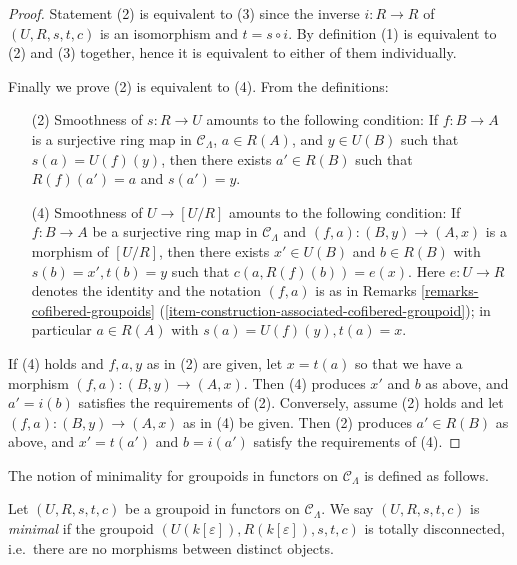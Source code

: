 \begin{proof}
Statement (2) is equivalent to (3) since the inverse $i: R \rightarrow R$ of 
$(U, R, s,t,c)$ is an isomorphism and $t = s \circ i$. By definition (1) is 
equivalent to (2) and (3) together, hence it is equivalent to either of them 
individually. 

\medskip \noindent
Finally we prove (2) is equivalent to (4). From the definitions:
\begin{enumerate}
\item[(2)] Smoothness of $s: R \rightarrow U$ amounts to the following 
condition: If $f: B \rightarrow A$ is a surjective ring map in $\mathcal 
C_{\Lambda}$, $a \in R(A)$, and $y \in U(B)$ such that $s(a) = U(f)(y)$, then 
there exists $a' \in R(B)$ such that $R(f)(a') = a$ and $s(a') = y$.

\item[(4)] Smoothness of $U \rightarrow [U/R]$ amounts to the following 
condition: If $f: B \rightarrow A$ be a surjective ring map in $\mathcal 
C_{\Lambda}$ and $(f,a): (B,y) \rightarrow (A,x)$ is a morphism of $[U/R]$, 
then there exists $x' \in U(B)$ and $b \in R(B)$ with $s(b) = x', t(b) = y$ 
such that $c(a,R(f)(b)) = e(x)$.  Here $e: U \rightarrow R$ denotes the 
identity and the notation $(f,a)$ is as in Remarks 
\ref{remarks-cofibered-groupoids} 
(\ref{item-construction-associated-cofibered-groupoid});
in particular $a \in R(A)$ with $s(a) = U(f)(y), t(a) = x$.  
\end{enumerate}
If (4) holds and $f,a,y$ as in (2) are given, let $x = t(a)$ so that we have a 
morphism $(f,a): (B,y) \rightarrow (A,x)$.  Then (4) produces $x'$ and $b$ as 
above, and $a' = i(b)$ satisfies the requirements of (2).  Conversely, assume 
(2) holds and let $(f,a): (B,y) \rightarrow (A,x)$ as in (4) be given.  Then 
(2) produces $a' \in R(B)$ as above, and $x' = t(a')$ and $b = i(a')$ satisfy 
the requirements of (4).
\end{proof}

\noindent
The notion of minimality for groupoids in functors on $\mathcal C_{\Lambda}$ is 
defined as follows.

\begin{definition}
\label{definition-minimal-groupoid-in-functors}
Let $(U, R, s,t,c)$ be a groupoid in functors on $\mathcal C_{\Lambda}$.  We 
say $(U, R, s,t,c)$ is {\it minimal} if the groupoid 
$(U(k[\varepsilon]),R(k[\varepsilon]), s,t,c)$ is totally disconnected, i.e.\ 
there are no morphisms between distinct objects.
\end{definition}

